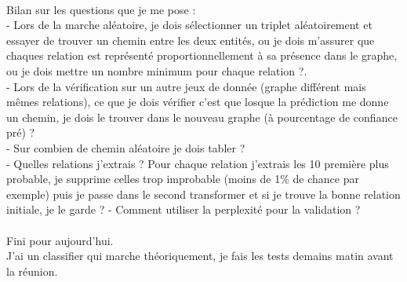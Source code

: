 \documentclass{article}
\begin{document}
\\
Bilan sur les questions que je me pose :\\
- Lors de la marche aléatoire, je dois sélectionner un triplet aléatoirement et essayer de trouver un chemin entre les deux entités, ou je dois m'assurer que chaques relation est représenté proportionnellement à sa présence dans le graphe, ou je dois mettre un nombre minimum pour chaque relation ?.\\
- Lors de la vérification sur un autre jeux de donnée (graphe différent mais mêmes relations), ce que je dois vérifier c'est que losque la prédiction me donne un chemin, je dois le trouver dans le nouveau graphe (à pourcentage de confiance pré) ?\\
- Sur combien de chemin aléatoire je dois tabler ?\\
- Quelles relations j'extrais ? Pour chaque relation j'extrais les 10 première plus probable, je supprime celles trop improbable (moins de 1\% de chance par exemple) puis je passe dans le second transformer et si je trouve la bonne relation initiale, je le garde ?
- Comment utiliser la perplexité pour la validation ?\\\\
Fini pour aujourd'hui.\\
J'ai un classifier qui marche théoriquement, je fais les tests demains matin avant la réunion.\\
\end{document}
